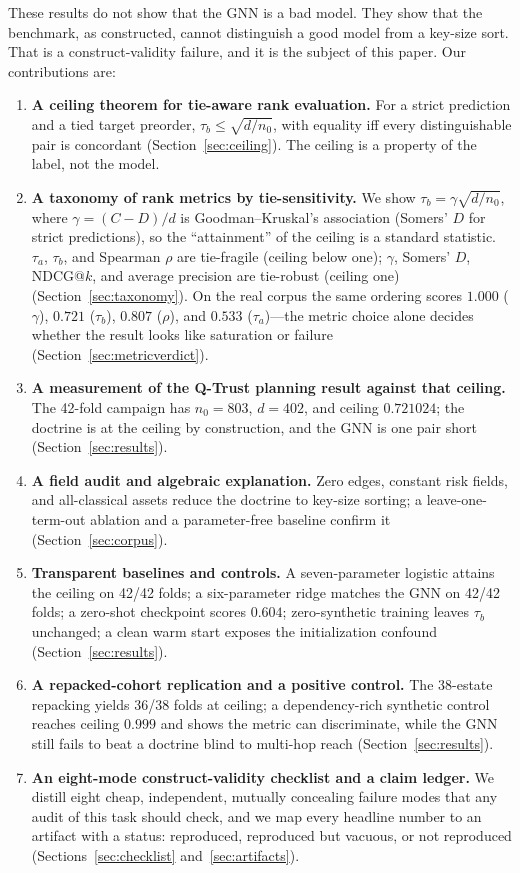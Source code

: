 \documentclass[conference,10pt]{IEEEtran}
\newcommand{\tb}{\tau_b}
\newcommand{\distinct}{d}
\newcommand{\nzero}{n_0}
\begin{document}
These results do not show that the GNN is a bad model. They show that the benchmark, as
constructed, cannot distinguish a good model from a key-size sort. That is a construct-validity
failure, and it is the subject of this paper. Our contributions are:
\begin{enumerate}
\item \textbf{A ceiling theorem for tie-aware rank evaluation.} For a strict prediction and a
tied target preorder, $\tb\le\sqrt{\distinct/\nzero}$, with equality iff every distinguishable
pair is concordant (Section~\ref{sec:ceiling}). The ceiling is a property of the label, not the
model.
\item \textbf{A taxonomy of rank metrics by tie-sensitivity.} We show $\tb=\gamma\sqrt{\distinct/\nzero}$,
where $\gamma=(C-D)/\distinct$ is Goodman--Kruskal's association (Somers' $D$ for strict
predictions), so the ``attainment'' of the ceiling is a standard statistic. $\tau_a$, $\tb$, and
Spearman $\rho$ are tie-fragile (ceiling below one); $\gamma$, Somers' $D$, NDCG@$k$, and
average precision are tie-robust (ceiling one) (Section~\ref{sec:taxonomy}). On the real corpus
the same ordering scores $1.000$ ($\gamma$), $0.721$ ($\tb$), $0.807$ ($\rho$), and $0.533$
($\tau_a$)---the metric choice alone decides whether the result looks like saturation or
failure (Section~\ref{sec:metricverdict}).
\item \textbf{A measurement of the Q-Trust planning result against that ceiling.} The 42-fold
campaign has $\nzero=803$, $\distinct=402$, and ceiling $0.721024$; the doctrine is at the
ceiling by construction, and the GNN is one pair short (Section~\ref{sec:results}).
\item \textbf{A field audit and algebraic explanation.} Zero edges, constant risk fields, and
all-classical assets reduce the doctrine to key-size sorting; a leave-one-term-out ablation and
a parameter-free baseline confirm it (Section~\ref{sec:corpus}).
\item \textbf{Transparent baselines and controls.} A seven-parameter logistic attains the
ceiling on 42/42 folds; a six-parameter ridge matches the GNN on 42/42 folds; a zero-shot
checkpoint scores $0.604$; zero-synthetic training leaves $\tb$ unchanged; a clean warm start
exposes the initialization confound (Section~\ref{sec:results}).
\item \textbf{A repacked-cohort replication and a positive control.} The 38-estate repacking
yields 36/38 folds at ceiling; a dependency-rich synthetic control reaches ceiling $0.999$ and
shows the metric can discriminate, while the GNN still fails to beat a doctrine blind to
multi-hop reach (Section~\ref{sec:results}).
\item \textbf{An eight-mode construct-validity checklist and a claim ledger.} We distill eight
cheap, independent, mutually concealing failure modes that any audit of this task should check,
and we map every headline number to an artifact with a status: reproduced, reproduced but
vacuous, or not reproduced (Sections~\ref{sec:checklist} and~\ref{sec:artifacts}).
\end{enumerate}
\end{document}
